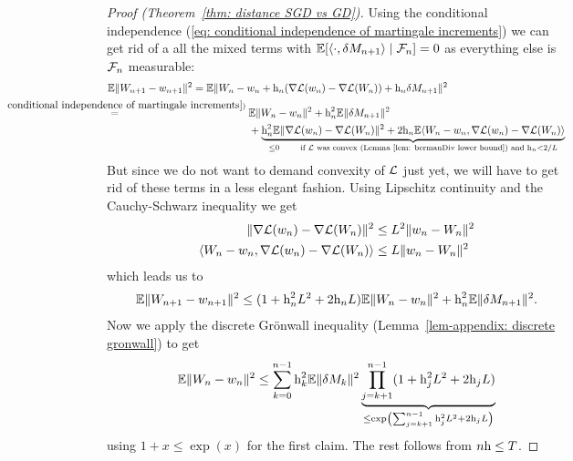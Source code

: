 \begin{proof}[Proof (Theorem~\ref{thm: distance SGD vs GD})]
	Using the conditional independence (\ref{eq: conditional independence of martingale increments})
	we can get rid of a all the mixed terms with
	\(\mathbb{E}[\langle \cdot, \delta M_{n+1}\rangle\mid\mathcal{F}_n]=0\) as everything
	else is \(\mathcal{F}_n\) measurable:
	\begin{align*}
		&\E\|\Weights_{n+1}-\weights_{n+1}\|^2
		= \E\|\Weights_n - \weights_n
		+ \lr_n(\nabla\Loss(\weights_n)-\nabla\Loss(\Weights_n))
		+ \lr_n\martIncr_{n+1}\|^2\\
		&\lxeq{(\ref{eq: conditional independence of martingale increments})}
		\begin{aligned}[t]
			&\E\|\Weights_n-\weights_n\|^2 + \lr_n^2\E\|\martIncr_{n+1}\|^2\\
			&+\underbrace{
				\lr_n^2\E\|\nabla\Loss(\weights_n)-\nabla\Loss(\Weights_n)\|^2
				+ 2\lr_n\E\langle\Weights_n-\weights_n,
				\nabla\Loss(\weights_n)-\nabla\Loss(\Weights_n)\rangle
			}_{
				\le 0 \qquad
				\text{if \(\Loss\) was convex (Lemma~\ref{lem: bermanDiv lower bound}) and }
				\lr_n<2/\ubound
			}
		\end{aligned}
	\end{align*}
	But since we do not want to demand convexity of \(\mathcal{L}\) just yet, we will
	have to get rid of these terms in a less elegant fashion. Using Lipschitz
	continuity and the Cauchy-Schwarz inequality we get
	\begin{align*}
		\|\nabla\mathcal{L}(w_n)-\nabla\mathcal{L}(W_n)\|^2
		&\le L^2\|w_n-W_n\|^2\\
		\langle W_n-w_n,
		\nabla\mathcal{L}(w_n)-\nabla\mathcal{L}(W_n)\rangle
		&\le L \|w_n-W_n\|^2
	\end{align*}
	which leads us to
	\begin{align*}
		\mathbb{E}\|W_{n+1}-w_{n+1}\|^2
		\le (1+\text{h}_n^2L^2 + 2\text{h}_nL)\mathbb{E}\|W_n-w_n\|^2
		+ \text{h}_n^2\mathbb{E}\|\delta M_{n+1}\|^2.
	\end{align*}
	Now we apply the discrete Gr\"onwall inequality (Lemma~\ref{lem-appendix:
	discrete gronwall}) to get
	\begin{align*}
		\mathbb{E}\|W_n-w_n\|^2
		\le \sum_{k=0}^{n-1}\text{h}_k^2\mathbb{E}\|\delta M_k\|^2
		\underbrace{
			\prod_{j=k+1}^{n-1}(1+\text{h}_j^2L^2 + 2\text{h}_jL)
		}_{
			\le \exp\left(\sum_{j=k+1}^{n-1}\text{h}_j^2L^2 + 2\text{h}_jL\right)
		}
	\end{align*}
	using \(1+x\le\exp(x)\) for the first claim. The rest 
	follows from \(n\text{h}\le T\).
\end{proof}


